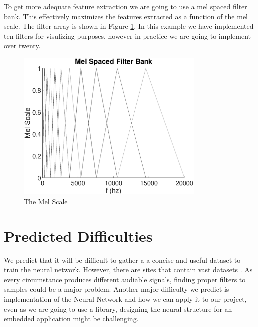 \documentclass[12pt,journal,compsoc]{IEEEtran}
\begin{document}
To get more adequate feature extraction we are going to use a mel spaced filter bank. This effectively maximizes the features extracted as a function of the mel scale. The filter array is shown in Figure \ref{FA}. In this example we have implemented ten filters for visulizing purposes, however in practice we are going to implement over twenty.

\begin{figure}[h]
\includegraphics[width=9cm]{FA.eps}
\caption{The Mel Scale}
\label{FA}
\end{figure}

\section{Predicted Difficulties}
We predict that it will be difficult to gather a a concise and useful dataset to train the neural network. However, there are sites that contain vast datasets \cite{Bird}. As every circumstance produces different audiable signals, finding proper filters to samples could be a major problem. Another major difficulty we predict is implementation of the  Neural Network and how we can apply it to our project, even as we are going to use a library, designing the neural structure for an embedded application might be challenging.
\end{document}
